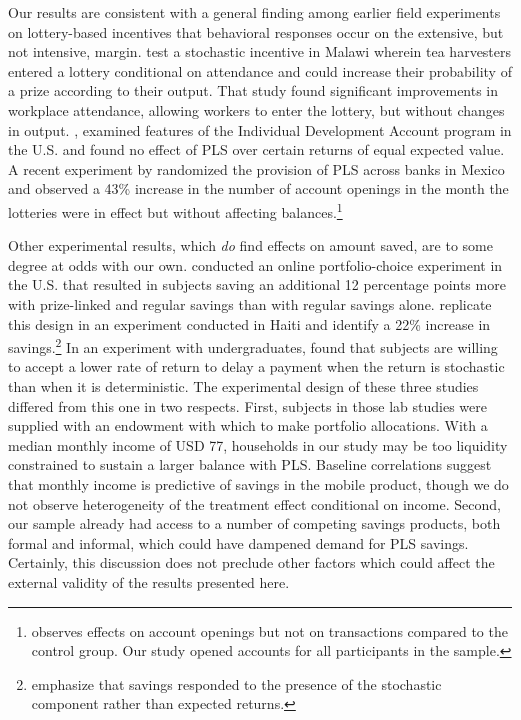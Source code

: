 \documentclass[11pt]{article}
\begin{document}
		Our results are consistent with a general finding among earlier field experiments on lottery-based incentives that behavioral responses occur on the extensive, but not intensive, margin. \textcite{brune_effect_2015} test a stochastic incentive in Malawi wherein tea harvesters entered a lottery conditional on attendance and could increase their probability of a prize according to their output. That study found significant improvements in workplace attendance, allowing workers to enter the lottery, but without changes in output. \textcite{loibl_testing_2016}, examined features of the Individual Development Account program in the U.S. and found no effect of PLS over certain returns of equal expected value. A recent experiment by \textcite{gertler_long-term_2017} randomized the provision of PLS across banks in Mexico and observed a 43\% increase in the number of account openings in the month the lotteries were in effect but without affecting balances.\footnote{\textcite{gertler_long-term_2017} observes effects on account openings but not on transactions compared to the control group. Our study opened accounts for all participants in the sample.}

		Other experimental results, which \emph{do} find effects on amount saved, are to some degree at odds with our own. \textcite{atalay_savings_2014} conducted an online portfolio-choice experiment in the U.S. that resulted in subjects saving an additional 12 percentage points more with prize-linked and regular savings than with regular savings alone. \textcite{dizon_leveraging_2016} replicate this design in an experiment conducted in Haiti and identify a 22\% increase in savings.\footnote{\textcite{dizon_leveraging_2016} emphasize that savings responded to the presence of the stochastic component rather than expected returns.} In an experiment with undergraduates, \textcite{filiz-ozbay_lottery_2015} found that subjects are willing to accept a lower rate of return to delay a payment when the return is stochastic than when it is deterministic. The experimental design of these three studies differed from this one in two respects. First, subjects in those lab studies were supplied with an endowment with which to make portfolio allocations. With a median monthly income of USD 77, households in our study may be too liquidity constrained to sustain a larger balance with PLS. Baseline correlations suggest that monthly income is predictive of savings in the mobile product, though we do not observe heterogeneity of the treatment effect conditional on income. Second, our sample already had access to a number of competing savings products, both formal and informal, which could have dampened demand for PLS savings. Certainly, this discussion does not preclude other factors which could affect the external validity of the results presented here.
\end{document}
